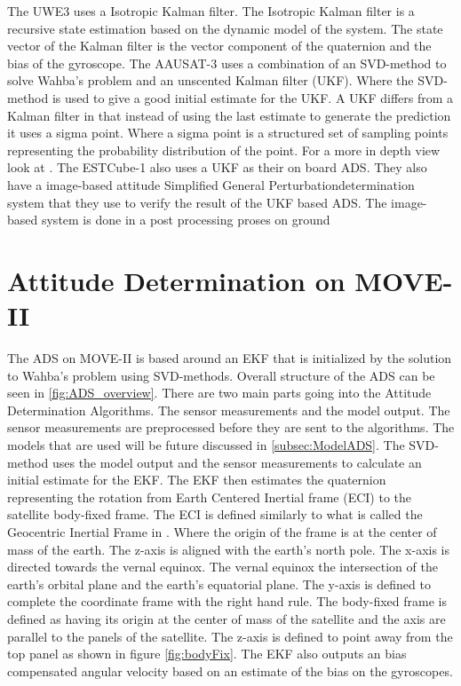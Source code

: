 The UWE3 uses a Isotropic Kalman filter. The Isotropic Kalman filter is a recursive state estimation based on the dynamic model of the system. The state vector of the Kalman filter is the vector component of the quaternion and the bias of the gyroscope\cite{UWE-3}. The AAUSAT-3 uses a combination of an SVD-method to solve Wahba's problem and an unscented Kalman filter (UKF). Where the SVD-method is used to give a good initial estimate for the UKF. A UKF differs from a Kalman filter in that instead of using the last estimate to generate the prediction it uses a sigma point. Where a sigma point is a structured set of sampling points representing the probability distribution of the point. For a more in depth view look at \cite{attdetSur}. The ESTCube-1 also uses a UKF as their on board ADS. They also have a image-based attitude Simplified General Perturbationdetermination system that they use to verify the result of the UKF based ADS. The image-based system is done in a post processing proses on ground \cite{EST}

\section{Attitude Determination on MOVE-II}
The ADS on MOVE-II is based around an EKF that is initialized by the solution to Wahba's problem using SVD-methods. Overall structure of the ADS can be seen in \autoref{fig:ADS_overview}. There are two main parts going into the Attitude Determination Algorithms. The sensor measurements and the model output. The sensor measurements are preprocessed before they are sent to the algorithms. The models that are used will be future discussed in \autoref{subsec:ModelADS}. The SVD-method uses the model output and the sensor measurements to calculate an initial estimate for the EKF. The EKF then estimates the quaternion representing the rotation from Earth Centered Inertial frame (ECI) to the satellite body-fixed frame. The ECI is defined similarly to what is called the Geocentric Inertial Frame in \cite{SADCS}. Where the origin of the frame is at the center of mass of the earth. The z-axis is aligned with the earth's north pole. The x-axis is directed towards the vernal equinox. The vernal equinox the intersection of the earth's orbital plane and the earth's equatorial plane. The y-axis is defined to complete the coordinate frame with the right hand rule. The body-fixed frame is defined as having its origin at the center of mass of the satellite and the axis are parallel to the panels of the satellite. The z-axis is defined to point away from the top panel as shown in figure \autoref{fig:bodyFix}. The EKF also outputs an bias compensated angular velocity based on an estimate of the bias on the gyroscopes.

